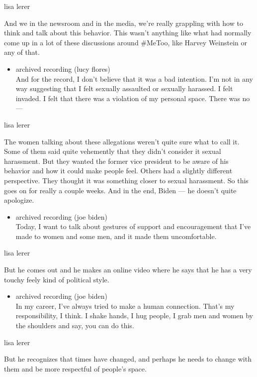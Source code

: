 lisa lerer

And we in the newsroom and in the media, we're really grappling with how
to think and talk about this behavior. This wasn't anything like what
had normally come up in a lot of these discussions around \#MeToo, like
Harvey Weinstein or any of that.

\begin{itemize}
\tightlist
\item
  archived recording (lucy flores)\\
  And for the record, I don't believe that it was a bad intention. I'm
  not in any way suggesting that I felt sexually assaulted or sexually
  harassed. I felt invaded. I felt that there was a violation of my
  personal space. There was no ---
\end{itemize}

lisa lerer

The women talking about these allegations weren't quite sure what to
call it. Some of them said quite vehemently that they didn't consider it
sexual harassment. But they wanted the former vice president to be aware
of his behavior and how it could make people feel. Others had a slightly
different perspective. They thought it was something closer to sexual
harassment. So this goes on for really a couple weeks. And in the end,
Biden --- he doesn't quite apologize.

\begin{itemize}
\tightlist
\item
  archived recording (joe biden)\\
  Today, I want to talk about gestures of support and encouragement that
  I've made to women and some men, and it made them uncomfortable.
\end{itemize}

lisa lerer

But he comes out and he makes an online video where he says that he has
a very touchy feely kind of political style.

\begin{itemize}
\tightlist
\item
  archived recording (joe biden)\\
  In my career, I've always tried to make a human connection. That's my
  responsibility, I think. I shake hands, I hug people, I grab men and
  women by the shoulders and say, you can do this.
\end{itemize}

lisa lerer

But he recognizes that times have changed, and perhaps he needs to
change with them and be more respectful of people's space.

